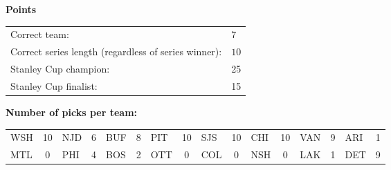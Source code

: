 \documentclass[10pt]{article}
\begin{document}
{\bf Points}\\
\begin{minipage}{12cm}
    \begin{tabular}{l l}
        Correct team:	& $7$\\
        Correct series length (regardless of series winner):	& $10$\\
        Stanley Cup champion:	& 25\\
        Stanley Cup finalist:	& 15\\
    \end{tabular}

    \vspace{1cm}
    {\bf Number of picks per team:}\\
    \begin{tabular}{lc | lc | lc | lc | lc | lc | lc | lc }
        WSH & 10 & NJD & 6 & BUF & 8 & PIT & 10 & SJS & 10 & CHI & 10 & VAN & 9 & ARI & 1 \\
        MTL & 0 & PHI & 4 & BOS & 2 & OTT & 0 & COL & 0 & NSH & 0 & LAK & 1 & DET & 9 \\
    \end{tabular}
\end{minipage}
\end{document}
